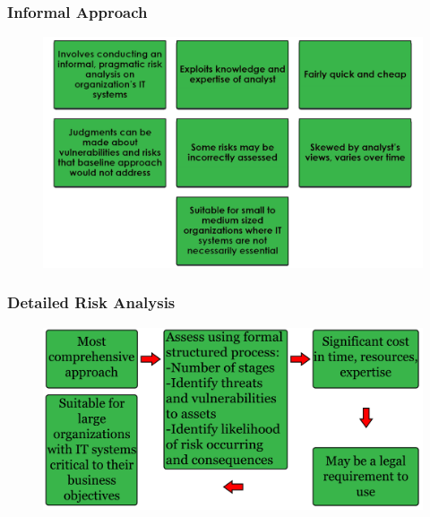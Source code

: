 \documentclass[xcolor ={table,usenames,dvipsnames}]{beamer}
\theoremstyle{definition}
\begin{document}
	\begin{frame}
		\frametitle{Informal Approach}
		\begin{figure}[h!]
			\centering
			\includegraphics[scale=0.27]{img/img_07.PNG}
			\label{Interfacce di un CS}
		\end{figure}
	\end{frame}

	\begin{frame}
		\frametitle{Detailed Risk Analysis}
		\begin{figure}[h!]
			\centering
			\includegraphics[scale=0.23]{img/img_08.PNG}
			\label{Interfacce di un CS}
		\end{figure}
	\end{frame}

	
\end{document}
